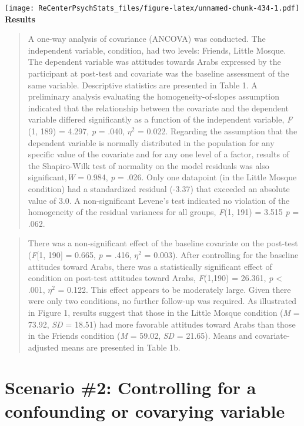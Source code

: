 \documentclass[
  11pt,
]{book}
\begin{document}
\texttt{[image: ReCenterPsychStats\_files/figure-latex/unnamed-chunk-434-1.pdf]}
\textbf{Results}

\begin{quote}
A one-way analysis of covariance (ANCOVA) was conducted. The independent variable, condition, had two levels: Friends, Little Mosque. The dependent variable was attitudes towards Arabs expressed by the participant at post-test and covariate was the baseline assessment of the same variable. Descriptive statistics are presented in Table 1. A preliminary analysis evaluating the homogeneity-of-slopes assumption indicated that the relationship between the covariate and the dependent variable differed significantly as a function of the independent variable, \emph{F} (1, 189) = 4.297, \emph{p} = .040, \(\eta^2\) = 0.022. Regarding the assumption that the dependent variable is normally distributed in the population for any specific value of the covariate and for any one level of a factor, results of the Shapiro-Wilk test of normality on the model residuals was also significant,\emph{W} = 0.984, \emph{p} = .026. Only one datapoint (in the Little Mosque condition) had a standardized residual (-3.37) that exceeded an absolute value of 3.0. A non-significant Levene's test indicated no violation of the homogeneity of the residual variances for all groups, \emph{F}(1, 191) = 3.515 \emph{p} = .062.
\end{quote}

\begin{quote}
There was a non-significant effect of the baseline covariate on the post-test (\emph{F}{[}1, 190{]} = 0.665, \emph{p} = .416, \(\eta^2\) = 0.003). After controlling for the baseline attitudes toward Arabs, there was a statistically significant effect of condition on post-test attitudes toward Arabs, \emph{F}(1,190) = 26.361, \emph{p} \textless{} .001, \(\eta^2\) = 0.122. This effect appears to be moderately large. Given there were only two conditions, no further follow-up was required. As illustrated in Figure 1, results suggest that those in the Little Mosque condition (\emph{M} = 73.92, \emph{SD} = 18.51) had more favorable attitudes toward Arabs than those in the Friends condition (\emph{M} = 59.02, \emph{SD} = 21.65). Means and covariate-adjusted means are presented in Table 1b.
\end{quote}

\hypertarget{scenario-2-controlling-for-a-confounding-or-covarying-variable}{%
\section{Scenario \#2: Controlling for a confounding or covarying variable}\label{scenario-2-controlling-for-a-confounding-or-covarying-variable}}
\end{document}
